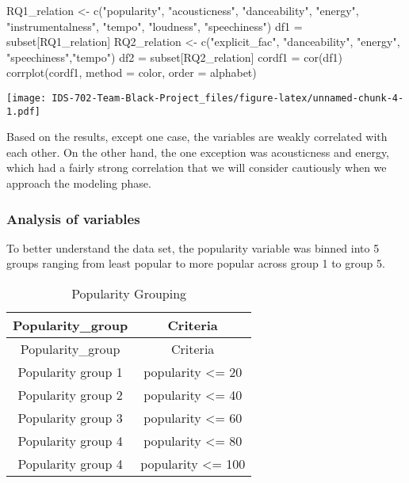 \documentclass[
]{article}
\newenvironment{Shaded}{\begin{snugshade}}{\end{snugshade}}
\newcommand{\AttributeTok}[1]{\textcolor[rgb]{0.77,0.63,0.00}{#1}}
\newcommand{\FunctionTok}[1]{\textcolor[rgb]{0.00,0.00,0.00}{#1}}
\newcommand{\NormalTok}[1]{#1}
\newcommand{\OtherTok}[1]{\textcolor[rgb]{0.56,0.35,0.01}{#1}}
\newcommand{\StringTok}[1]{\textcolor[rgb]{0.31,0.60,0.02}{#1}}
\begin{document}
\begin{Shaded}
\begin{Highlighting}[]
\NormalTok{RQ1\_relation }\OtherTok{\textless{}{-}} \FunctionTok{c}\NormalTok{(}\StringTok{"popularity"}\NormalTok{, }\StringTok{"acousticness"}\NormalTok{, }\StringTok{"danceability"}\NormalTok{, }\StringTok{"energy"}\NormalTok{, }\StringTok{"instrumentalness"}\NormalTok{, }\StringTok{"tempo"}\NormalTok{, }\StringTok{"loudness"}\NormalTok{, }\StringTok{"speechiness"}\NormalTok{)}
\NormalTok{df1 }\OtherTok{=}\NormalTok{ subset[RQ1\_relation]}
\NormalTok{RQ2\_relation }\OtherTok{\textless{}{-}} \FunctionTok{c}\NormalTok{(}\StringTok{"explicit\_fac"}\NormalTok{, }\StringTok{"danceability"}\NormalTok{, }\StringTok{"energy"}\NormalTok{, }\StringTok{"speechiness"}\NormalTok{,}\StringTok{"tempo"}\NormalTok{)}
\NormalTok{df2 }\OtherTok{=}\NormalTok{ subset[RQ2\_relation]}
\NormalTok{cordf1 }\OtherTok{=} \FunctionTok{cor}\NormalTok{(df1)}
\FunctionTok{corrplot}\NormalTok{(cordf1, }\AttributeTok{method =} \StringTok{\textquotesingle{}color\textquotesingle{}}\NormalTok{, }\AttributeTok{order =} \StringTok{\textquotesingle{}alphabet\textquotesingle{}}\NormalTok{)}
\end{Highlighting}
\end{Shaded}

\texttt{[image: IDS-702-Team-Black-Project\_files/figure-latex/unnamed-chunk-4-1.pdf]}

Based on the results, except one case, the variables are weakly
correlated with each other. On the other hand, the one exception was
acousticness and energy, which had a fairly strong correlation that we
will consider cautiously when we approach the modeling phase.

\hypertarget{analysis-of-variables}{%
\subsubsection{Analysis of variables}\label{analysis-of-variables}}

To better understand the data set, the popularity variable was binned
into 5 groups ranging from least popular to more popular across group 1
to group 5.

\begin{longtable}[]{@{}cc@{}}
\caption{Popularity Grouping}\tabularnewline
\toprule
Popularity\_group & Criteria \\
\midrule
\endfirsthead
\toprule
Popularity\_group & Criteria \\
\midrule
\endhead
Popularity group 1 & popularity \textless= 20 \\
Popularity group 2 & popularity \textless= 40 \\
Popularity group 3 & popularity \textless= 60 \\
Popularity group 4 & popularity \textless= 80 \\
Popularity group 4 & popularity \textless= 100 \\
\bottomrule
\end{longtable}
\end{document}
